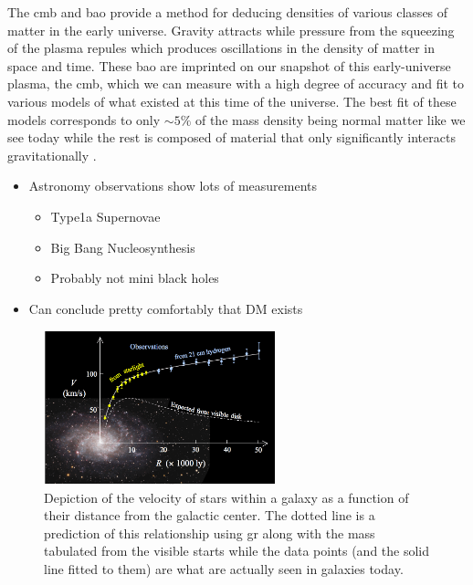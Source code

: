 The \gls{cmb} and \gls{bao} provide a method for deducing densities of various classes of matter
in the early universe. Gravity attracts while pressure from the squeezing of the plasma repules
which produces oscillations in the density of matter in space and time. These \gls{bao} are
imprinted on our snapshot of this early-universe plasma, the \gls{cmb}, which we can measure with
a high degree of accuracy and fit to various models of what existed at this time of the universe.
The best fit of these models corresponds to only $\sim 5\%$ of the mass density being normal matter
like we see today while the rest is composed of material that only significantly
interacts gravitationally \cite{planck-cmb-2015}.

\begin{itemize}
    \item Astronomy observations show lots of measurements
          \begin{itemize}
              \item Type1a Supernovae \cite{type1a-supernova-2010}
              \item Big Bang Nucleosynthesis \cite{nucleosynthesis-1998}
              \item Probably not mini black holes \cite{constraints-primordial-black-holes-2021}
          \end{itemize}
    \item Can conclude pretty comfortably that DM exists
\end{itemize}

\begin{figure}
    \centering
    \includegraphics[width=0.6\textwidth]{figures/theory/rotation-curve-evidence-for-dm.png}
    \caption{
        Depiction of the velocity of stars within a galaxy as a function of their distance
        from the galactic center. The dotted line is a prediction of this relationship using
        \gls{gr} along with the mass tabulated from the visible starts while the data points
        (and the solid line fitted to them) are what are actually seen in galaxies today.
    }
    \label{fig:rotation-curve}
\end{figure}

